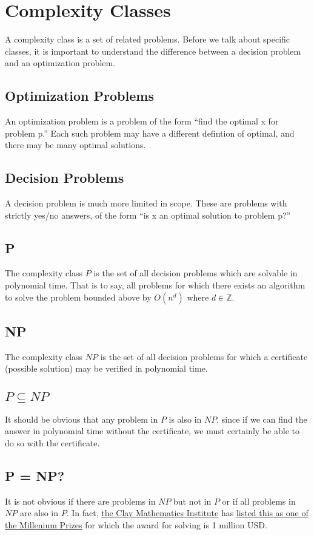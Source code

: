\chapter{Complexity Classes}

A complexity class is a set of related problems.  Before we talk about
specific classes, it is important to understand the difference between
a decision problem and an optimization problem.

\section{Optimization Problems}

An optimization problem is a problem of the form ``find the optimal x
for problem p.''  Each such problem may have a different defintion of
optimal, and there may be many optimal solutions.

\section{Decision Problems}

A decision problem is much more limited in scope.  These are problems
with strictly yes/no answers, of the form ``is x an optimal solution
to problem p?''

\section{P}

The complexity class $P$ is the set of all decision problems which are
solvable in polynomial time.  That is to say, all problems for which
there exists an algorithm to solve the problem bounded above by
$O(n^d)$ where $d \in \mathbb{Z}$.

\section{NP}

The complexity class $NP$ is the set of all decision problems for
which a certificate (possible solution) may be verified in polynomial
time.  

\section{$P \subseteq NP$}

It should be obvious that any problem in $P$ is also in $NP$, since if
we can find the answer in polynomial time without the certificate, we
must certainly be able to do so with the certificate.

\section{P = NP?}

It is not obvious if there are problems in $NP$ but not in $P$ or if
all problems in $NP$ are also in $P$.  In fact,
\href{http://www.claymath.org/}{the Clay Mathematics Institute} has
\href{http://www.claymath.org/millennium/P_vs_NP/}{listed this as one
  of the Millenium Prizes} for which the award for solving is 1
million USD.
